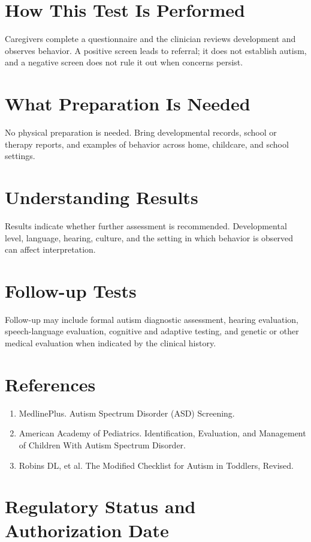 \section*{How This Test Is Performed}
Caregivers complete a questionnaire and the clinician reviews development and observes behavior. A positive screen leads to referral; it does not establish autism, and a negative screen does not rule it out when concerns persist.

\section*{What Preparation Is Needed}
No physical preparation is needed. Bring developmental records, school or therapy reports, and examples of behavior across home, childcare, and school settings.

\section*{Understanding Results}
Results indicate whether further assessment is recommended. Developmental level, language, hearing, culture, and the setting in which behavior is observed can affect interpretation.

\section*{Follow-up Tests}
Follow-up may include formal autism diagnostic assessment, hearing evaluation, speech-language evaluation, cognitive and adaptive testing, and genetic or other medical evaluation when indicated by the clinical history.

\section*{References}
\begin{enumerate}
  \item MedlinePlus. Autism Spectrum Disorder (ASD) Screening.
  \item American Academy of Pediatrics. Identification, Evaluation, and Management of Children With Autism Spectrum Disorder.
  \item Robins DL, et al. The Modified Checklist for Autism in Toddlers, Revised.
\end{enumerate}

\clearpage


\section*{Regulatory Status and Authorization Date}

\clearpage
